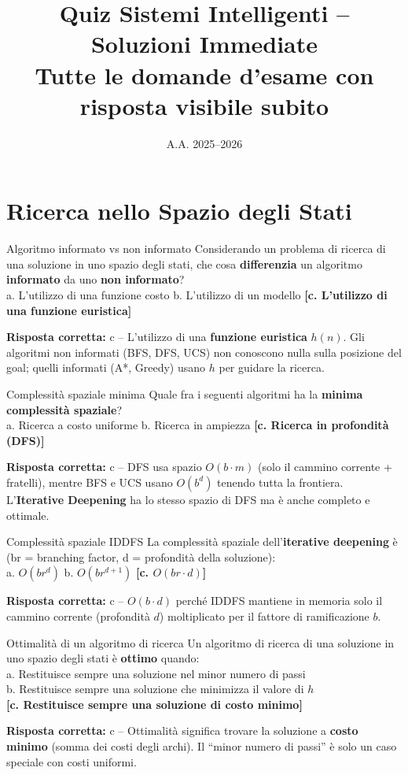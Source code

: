 \documentclass[12pt,a4paper]{article}
\title{\textbf{Quiz Sistemi Intelligenti -- Soluzioni Immediate}\\[4pt]
{\large Tutte le domande d'esame con risposta visibile subito}}
\author{}
\date{A.A. 2025--2026}
\newcommand{\corr}[1]{\textcolor{green!55!black}{\textbf{[#1]}}}
\newcommand{\risp}[1]{\begin{abox}\textbf{Risposta corretta: }#1\end{abox}}
\begin{document}
\maketitle
\tableofcontents
\newpage

\section{Ricerca nello Spazio degli Stati}

\begin{qbox}{Algoritmo informato vs non informato}
Considerando un problema di ricerca di una soluzione in uno spazio degli stati, che cosa
\textbf{differenzia} un algoritmo \textbf{informato} da uno \textbf{non informato}?\\[4pt]
a. L'utilizzo di una funzione costo \quad
b. L'utilizzo di un modello \quad
\corr{c. L'utilizzo di una funzione euristica}
\end{qbox}
\risp{c -- L'utilizzo di una \textbf{funzione euristica} $h(n)$. Gli algoritmi non informati (BFS, DFS, UCS) non conoscono nulla sulla posizione del goal; quelli informati (A*, Greedy) usano $h$ per guidare la ricerca.}

\bigskip
\begin{qbox}{Complessità spaziale minima}
Quale fra i seguenti algoritmi ha la \textbf{minima complessità spaziale}?\\[4pt]
a. Ricerca a costo uniforme \quad
b. Ricerca in ampiezza \quad
\corr{c. Ricerca in profondità (DFS)}
\end{qbox}
\risp{c -- DFS usa spazio $O(b \cdot m)$ (solo il cammino corrente + fratelli), mentre BFS e UCS usano $O(b^d)$ tenendo tutta la frontiera. L'\textbf{Iterative Deepening} ha lo stesso spazio di DFS ma è anche completo e ottimale.}

\bigskip
\begin{qbox}{Complessità spaziale IDDFS}
La complessità spaziale dell'\textbf{iterative deepening} è (br = branching factor, d = profondità
della soluzione):\\[4pt]
a. $O(br^d)$ \quad b. $O(br^{d+1})$ \quad \corr{c. $O(br \cdot d)$}
\end{qbox}
\risp{c -- $O(b \cdot d)$ perché IDDFS mantiene in memoria solo il cammino corrente (profondità $d$) moltiplicato per il fattore di ramificazione $b$.}

\bigskip
\begin{qbox}{Ottimalità di un algoritmo di ricerca}
Un algoritmo di ricerca di una soluzione in uno spazio degli stati è \textbf{ottimo} quando:
\\[4pt]
a. Restituisce sempre una soluzione nel minor numero di passi\\
b. Restituisce sempre una soluzione che minimizza il valore di $h$\\
\corr{c. Restituisce sempre una soluzione di costo minimo}
\end{qbox}
\risp{c -- Ottimalità significa trovare la soluzione a \textbf{costo minimo} (somma dei costi degli archi). Il ``minor numero di passi'' è solo un caso speciale con costi uniformi.}
\end{document}
